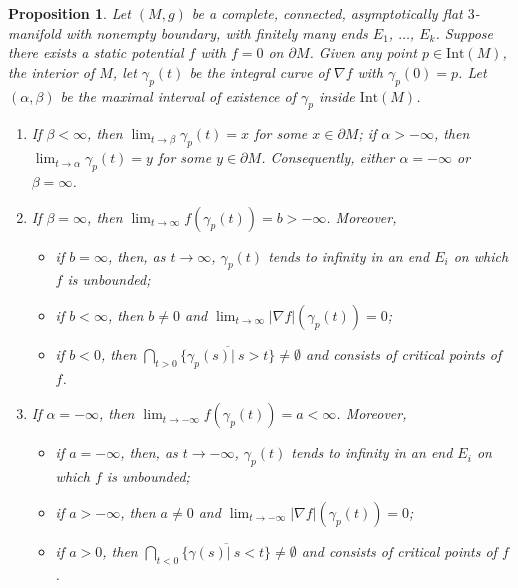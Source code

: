 \documentclass[12pt]{amsart}
\newtheorem{prop}{Proposition}[section]
\theoremstyle{remark}
\numberwithin{equation}{section}
\def\p{\partial}
\def\vh{\vspace{.2cm}}
\def\Int{\text{Int}}
\def\a{\alpha}
\begin{document}
\begin{prop} \label{prop-integral-curve}
Let $(M,g)$ be a complete, connected, asymptotically flat $3$-manifold with nonempty boundary,
with  finitely many ends  $E_1$, $\ldots$, $E_k$.
Suppose there exists a static potential  $f$  with $f=0$ on $\p M$.
Given any point $p \in \Int(M)$,  the interior of $M$,  let $\gamma_p(t)$ be the integral curve of $\nabla f$ with $\gamma_p(0)=p$.
Let $(\a,\beta)$ be the maximal interval  of existence of $\gamma_p$ inside  $\Int(M)$.

\begin{enumerate}
\item[(a)]   If $\beta <\infty$, then  $\lim_{t\to\beta}\gamma_p(t)=x$  for some $x\in \p M$;
if $\a>-\infty$, then $\lim_{t\to\a}\gamma_p(t)=y$ for some $y\in \p M$. Consequently,  either $\a=-\infty$ or $\beta=\infty$.

    \vh

\item[(b)]  If $\beta=\infty$, then $\lim_{t\to\infty}f(\gamma_p (t))=b>-\infty$. Moreover,

\vh

    \begin{itemize}

   \item[(i)] if $b=\infty$, then, as $t \to \infty$, $ \gamma_p(t) $  tends to infinity in an end $E_i$ on which  $f$ is unbounded;
   \vh
   \item[(ii)]  if $b<\infty$, then $ b \neq 0 $  and $\lim_{t\to\infty}|\nabla f|(\gamma_p (t))=0$;
   \vh
       \item[(iii)] if $b<0$, then
    $    \bigcap_{t>0}\overline{\{\gamma_p (s )|  \ s >t\}}\neq\emptyset $
    and consists of critical points of $f$.
    \end{itemize}

  \vh

\item[(c)]  If $\a=-\infty$, then $\lim_{t\to-\infty}f(\gamma_p (t))=a<\infty$. Moreover,
\vh
    \begin{itemize}
    \item[(i)] if $a=-\infty$, then,  as $t \to - \infty$, $ \gamma_p(t) $  tends to infinity in an end $E_i$ on which  $f$ is unbounded;
    \vh
         \item[(ii)]  if $a>-\infty$, then $ a \neq 0 $  and $\lim_{t\to-\infty}|\nabla f|(\gamma_p (t))=0$;
         \vh
             \item[(iii)] if $a> 0$, then $  \bigcap_{t<0}\overline{\{\gamma(s )|  \ s <t\}}\neq\emptyset $
    and consists of critical points of $f$.
\end{itemize}

\end{enumerate}
\end{prop}
\end{document}
